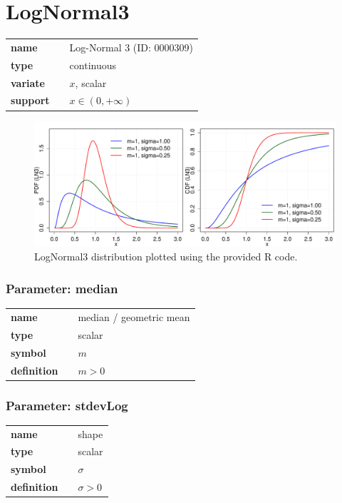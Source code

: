 \section*{LogNormal3} 

  \bigskip 

\begin{tabular}{p{2cm}cl}
\textbf{name} & & Log-Normal 3 (ID: 0000309)\\ 
 
\textbf{type} & & continuous \\ 

\textbf{variate} & & $x$, scalar \\ 

\textbf{support} & & $x \in (0,+\infty)$
\end{tabular}

\begin{figure}[ht!]
\centering
  \includegraphics[width=140mm]{pics/LogNormal3.pdf}
 \caption{LogNormal3 distribution plotted using the provided R code.}
 \label{fig:LogNormal3}
\end{figure}

\subsubsection*{Parameter: median}

\noindent\begin{tabular}{p{2cm}cl}
\textbf{name} & & median / geometric mean \\
\textbf{type} & & scalar \\
\textbf{symbol} & & $m$  \\
\textbf{definition} & & $m>0$
\end{tabular}
\subsubsection*{Parameter: stdevLog}

\noindent\begin{tabular}{p{2cm}cl}
\textbf{name} & & shape \\
\textbf{type} & & scalar \\
\textbf{symbol} & & $\sigma$  \\
\textbf{definition} & & $\sigma > 0$
\end{tabular}
